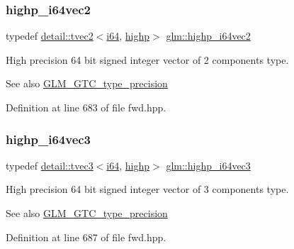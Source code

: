\subsubsection{\texorpdfstring{highp\+\_\+i64vec2}{highp\_i64vec2}}
{\footnotesize\ttfamily typedef \hyperlink{structglm_1_1detail_1_1tvec2}{detail\+::tvec2}$<$\hyperlink{group__gtc__type__precision_gac7a7eaad46064fc952b06df33689da23}{i64}, \hyperlink{namespaceglm_a0f04f086094c747d227af4425893f545ac6f7eab42eacbb10d59a58e95e362074}{highp}$>$ \hyperlink{group__gtc__type__precision_gabfe3aa6fa4003a47577beb9678ab2661}{glm\+::highp\+\_\+i64vec2}}

High precision 64 bit signed integer vector of 2 components type. \begin{DoxySeeAlso}{See also}
\hyperlink{group__gtc__type__precision}{G\+L\+M\+\_\+\+G\+T\+C\+\_\+type\+\_\+precision} 
\end{DoxySeeAlso}


Definition at line 683 of file fwd.\+hpp.

\mbox{\label{group__gtc__type__precision_ga4030f8ad15da56f5e427aa457d39e888}} 
\subsubsection{\texorpdfstring{highp\+\_\+i64vec3}{highp\_i64vec3}}
{\footnotesize\ttfamily typedef \hyperlink{structglm_1_1detail_1_1tvec3}{detail\+::tvec3}$<$\hyperlink{group__gtc__type__precision_gac7a7eaad46064fc952b06df33689da23}{i64}, \hyperlink{namespaceglm_a0f04f086094c747d227af4425893f545ac6f7eab42eacbb10d59a58e95e362074}{highp}$>$ \hyperlink{group__gtc__type__precision_ga4030f8ad15da56f5e427aa457d39e888}{glm\+::highp\+\_\+i64vec3}}

High precision 64 bit signed integer vector of 3 components type. \begin{DoxySeeAlso}{See also}
\hyperlink{group__gtc__type__precision}{G\+L\+M\+\_\+\+G\+T\+C\+\_\+type\+\_\+precision} 
\end{DoxySeeAlso}


Definition at line 687 of file fwd.\+hpp.

\mbox{\label{group__gtc__type__precision_ga0ea279cd954fbb71a1db62e897d4d7f5}} 

